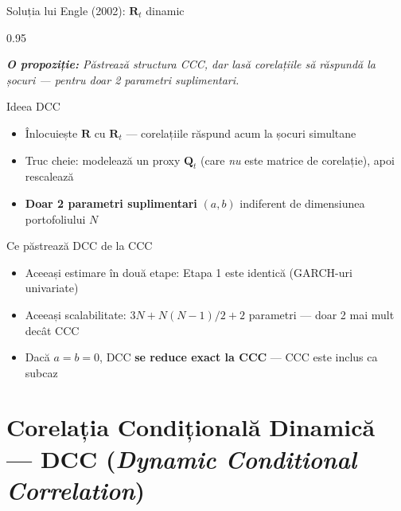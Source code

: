 \documentclass[9pt, aspectratio=169, t]{beamer}
\begin{document}
\begin{frame}{Soluția lui Engle (2002): $\mathbf{R}_t$ dinamic}
    \begin{cminipage}{0.95\textwidth}
    {\footnotesize
    \textit{\textbf{O propoziție:} Păstrează structura CCC, dar lasă corelațiile să răspundă la șocuri --- pentru doar 2 parametri suplimentari.}
    \vspace{0.2cm}
    \begin{block}{Ideea DCC}
        \begin{itemize}\setlength{\itemsep}{2pt}
            \item Înlocuiește $\mathbf{R}$ cu $\mathbf{R}_t$ --- corelațiile răspund acum la șocuri simultane
            \item Truc cheie: modelează un proxy $\mathbf{Q}_t$ (care \textit{nu} este matrice de corelație), apoi rescalează
            \item \textbf{Doar 2 parametri suplimentari} $(a, b)$ indiferent de dimensiunea portofoliului $N$
        \end{itemize}
    \end{block}
    \vspace{0.1cm}
    \begin{exampleblock}{Ce păstrează DCC de la CCC}
        \begin{itemize}\setlength{\itemsep}{0pt}
            \item Aceeași estimare în două etape: Etapa 1 este identică (GARCH-uri univariate)
            \item Aceeași scalabilitate: $3N + N(N-1)/2 + 2$ parametri --- doar 2 mai mult decât CCC
            \item Dacă $a = b = 0$, DCC \textbf{se reduce exact la CCC} --- CCC este inclus ca subcaz
        \end{itemize}
    \end{exampleblock}
    }
    \end{cminipage}
\end{frame}

\section{Corelația Condițională Dinamică --- DCC (\textit{Dynamic Conditional Correlation})}
\end{document}
